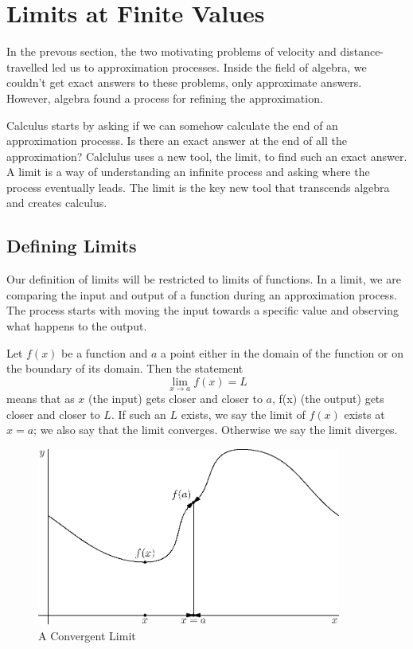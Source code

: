 \documentclass[fleqn]{report}
\begin{document}
\chapter{Limits at Finite Values}
\label{Limits af Finite Values}

In the prevous section, the two motivating problems of
velocity and distance-travelled led us to approximation
processes. Inside the field of algebra, we couldn't get exact
answers to these problems, only approximate answers. 
However, algebra found a process for refining the approximation. 

Calculus starts by asking if we can somehow calculate the end
of an approximation processs. Is there an exact answer at the
end of all the approximation? Calclulus uses a new tool, the
limit, to find such an exact answer. A limit is a way of
understanding an infinite process and asking where the process
eventually leads.  The limit is the key new tool that
transcends algebra and creates calculus.

\section*{Defining Limits}

Our definition of limits will be restricted to limits of
functions. In a limit, we are comparing the input and output
of a function during an approximation process. The process
starts with moving the input towards a specific value and
observing what happens to the output.

Let $f(x)$ be a function and $a$ a point either in the domain
of the function or on the boundary of its domain. Then the
statement 
\begin{equation*}
\lim_{x \rightarrow a} f(x) = L
\end{equation*}
means that as $x$ (the input) gets closer and closer to $a$,
f(x) (the output) gets closer and closer to $L$. If such an
$L$ exists, we say the limit of $f(x)$ exists at $x=a$; we
also say that the limit converges. Otherwise we say the limit
diverges. 
\clearpage

\begin{figure}[ht]
\centering
\includegraphics[width=10cm]{figure18.eps}
\caption{A Convergent Limit}
\label{A Convergent Limit}
\end{figure}
\end{document}
